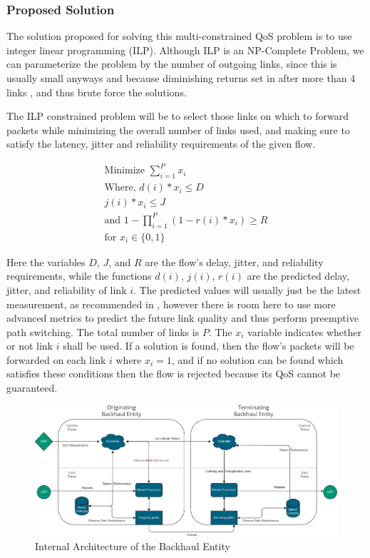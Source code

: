 \subsubsection{Proposed Solution}

The solution proposed for solving this multi-constrained QoS problem is to use integer linear programming (ILP). Although ILP is an NP-Complete Problem, we can parameterize the problem by the number of outgoing links, since this is usually small anyways and because diminishing returns set in after more than 4 links \cite{akella2003measurement}, and thus brute force the solutions.

The ILP constrained problem will be to select those links on which to forward packets while minimizing the overall number of links used, and making sure to satisfy the latency, jitter and reliability requirements of the given flow.

\begin{gather}
\text{Minimize } \sum_{i=1}^{P}x_i \\
\text{Where, } d(i) * x_i\le D \\
j(i) * x_i \le J \\
\text{and }1 - \prod_{i=1}^{P}{ ( 1- r(i) * x_i ) } \ge R  \\
\text{for } x_i \in \{0,1\}
\end{gather}

Here the variables $D$, $J$, and $R$ are the flow's delay, jitter, and reliability requirements, while the functions $d(i)$, $j(i)$, $r(i)$ are the predicted delay, jitter, and reliability of link $i$. The predicted values will usually just be the latest measurement, as recommended in \cite{akella2008performance}, however there is room here to use more advanced metrics to predict the future link quality and thus perform preemptive path switching. The total number of links is $P$. The $x_i$ variable indicates whether or not link $i$ shall be used. If a solution is found, then the flow's packets will be forwarded on each link $i$ where $x_i = 1$, and if no solution can be found which satisfies these conditions then the flow is rejected because its QoS cannot be guaranteed.

\begin{figure}[h]
    \centering
        \includegraphics[width=\textwidth]{fig/be-architecture.png}
        \caption{Internal Architecture of the Backhaul Entity}
        \label{fig:arch}
\end{figure}

